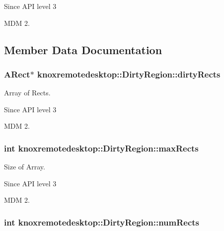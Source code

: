 \begin{DoxySince}{\-Since}
\-A\-P\-I level 3 

\-M\-D\-M 2. 
\end{DoxySince}


\subsection{\-Member \-Data \-Documentation}
\hypertarget{classknoxremotedesktop_1_1DirtyRegion_a46d58ad2c718f79613f9ad1b02d64c3d}{
\subsubsection[{dirty\-Rects}]{\setlength{\rightskip}{0pt plus 5cm}\-A\-Rect$\ast$ {\bf knoxremotedesktop\-::\-Dirty\-Region\-::dirty\-Rects}}}\label{classknoxremotedesktop_1_1DirtyRegion_a46d58ad2c718f79613f9ad1b02d64c3d}


\-Array of \-Rects. 

\begin{DoxySince}{\-Since}
\-A\-P\-I level 3 

\-M\-D\-M 2. 
\end{DoxySince}
\hypertarget{classknoxremotedesktop_1_1DirtyRegion_a65b638db44b5b39191e0d72123d9ccc8}{
\subsubsection[{max\-Rects}]{\setlength{\rightskip}{0pt plus 5cm}int {\bf knoxremotedesktop\-::\-Dirty\-Region\-::max\-Rects}}}\label{classknoxremotedesktop_1_1DirtyRegion_a65b638db44b5b39191e0d72123d9ccc8}


\-Size of \-Array. 

\begin{DoxySince}{\-Since}
\-A\-P\-I level 3 

\-M\-D\-M 2. 
\end{DoxySince}
\hypertarget{classknoxremotedesktop_1_1DirtyRegion_a433b848a889223e6b404cec9e8db0c7d}{
\subsubsection[{num\-Rects}]{\setlength{\rightskip}{0pt plus 5cm}int {\bf knoxremotedesktop\-::\-Dirty\-Region\-::num\-Rects}}}\label{classknoxremotedesktop_1_1DirtyRegion_a433b848a889223e6b404cec9e8db0c7d}


